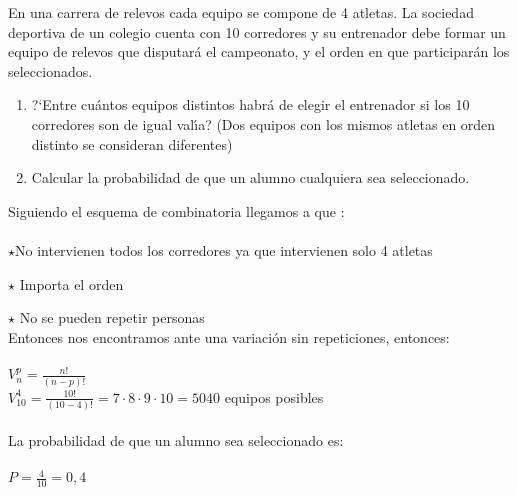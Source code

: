 \problem
En una carrera de relevos cada equipo  se  compone  de  4  atletas.  La
sociedad deportiva  de  un  colegio  cuenta  con  10  corredores  y  su
entrenador debe formar un equipo de relevos que disputar{\'a} el campeonato,
y el orden en que participar{\'a}n los seleccionados.
\begin{enumerate}
	\item ?`Entre cu{\'a}ntos equipos distintos habr{\'a} de elegir el entrenador si los
	10 corredores son de igual val{\'\i}a? (Dos equipos  con los mismos atletas en
	orden distinto se consideran diferentes)
	\item Calcular  la  probabilidad  de  que   un   alumno   cualquiera   sea
	seleccionado.
\end{enumerate}
\subproblem
Siguiendo el esquema de combinatoria llegamos a que : \\ \\
$ \star $No intervienen todos los corredores ya que intervienen solo 4 atletas

$ \star $ Importa el orden 

$ \star $ No se pueden repetir personas   \\

Entonces nos encontramos ante una variación sin repeticiones, entonces: \\ \\
$V^{p}_{n} = \frac{n!}{(n-p)!}$\\ 
$V^{4}_{10} = \frac{10!}{(10-4)!} = 7\cdot8\cdot9\cdot10 = 5040$ equipos posibles\\ \\
	
\subproblem
La probabilidad de que un alumno sea seleccionado es: \\ \\
$P = \frac{4}{10} = 0,4$
